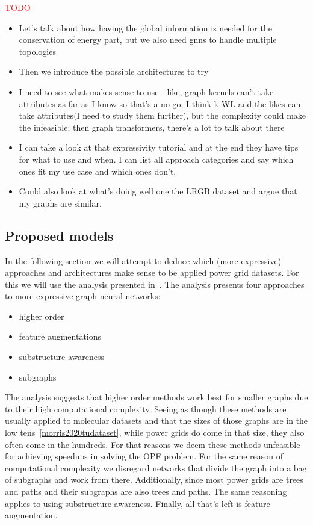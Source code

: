 \textcolor{red}{TODO}


\begin{itemize}
    \item Let's talk about how having the global information is needed for the conservation of energy
    part, but we also need gnns to handle multiple topologies
    \item Then we introduce the possible architectures to try
    \item I need to see what makes sense to use - like, graph kernels can't take attributes as far as I
    know so that's a no-go; I think k-WL and the likes can take attributes(I need to study them further),
    but the complexity could make the infeasible; then graph transformers, there's a lot to talk about there
    \item I can take a look at that expressivity tutorial and at the end they have tips for what to use and when.
    I can list all approach categories and say which ones fit my use case and which ones don't.
    \item Could also look at what's doing well one the LRGB dataset and argue that my graphs are similar.
\end{itemize}

\subsection*{Proposed models}
In the following section we will attempt to deduce which (more expressive) approaches and architectures
make sense to be applied power grid datasets.
For this we will use the analysis presented in~\cite{expresive2022tutorial}.
The analysis presents four approaches to more expressive graph neural networks:
\begin{itemize}
    \item higher order
    \item feature augmentations
    \item substructure awareness
    \item subgraphs
\end{itemize}

The analysis suggests that higher order methods work best for smaller graphs due to their high computational complexity.
Seeing as though these methods are usually applied to molecular datasets and that the sizes of those graphs are in
the low tens~\ref{morris2020tudataset}, while power grids do come in that size, they also often come in the hundreds.
For that reasons we deem these methods unfeasible for achieving speedups in solving the OPF problem.
For the same reason of computational complexity we disregard networks that divide the graph into a bag of subgraphs and work from there.
Additionally, since most power grids are trees and paths and their subgraphs are also trees and paths.
The same reasoning applies to using substructure awareness.
Finally, all that's left is feature augmentation.



